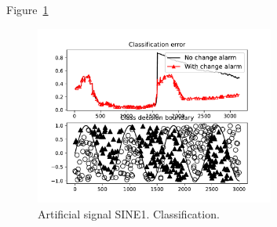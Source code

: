 \documentclass[12 pt]{article}
\begin{document}
  Figure~\ref{fig:sine1_example}
  \begin{figure}[!htb]
    \centering
    \includegraphics[width=0.7\textwidth]{images/proof_of_concept_dt_sine1}
    \caption{Artificial signal SINE1. Classification.}\label{fig:sine1_example}
  \end{figure}


  
  
\end{document}
